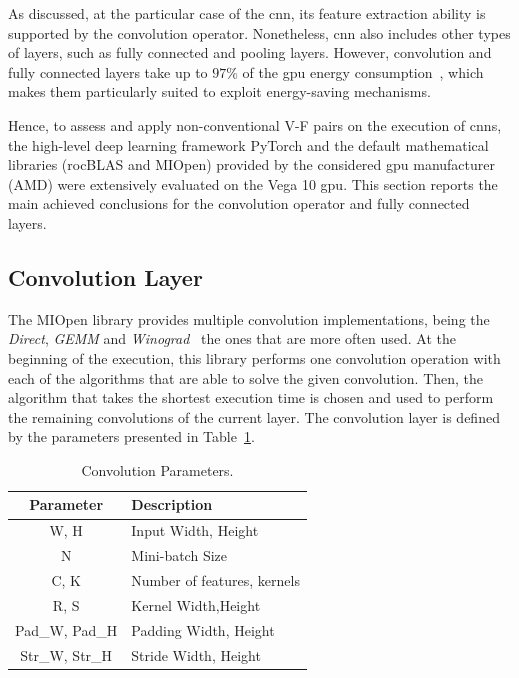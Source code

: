 As discussed, at the particular case of the \acrshort{cnn}, its feature extraction ability is supported by the convolution operator. Nonetheless, \acrshort{cnn} also includes other types of layers, such as fully connected and pooling layers. However, convolution and fully connected layers take up to $97\%$ of the \acrshort{gpu} energy consumption~\cite{li_evaluating_2016}, which makes them particularly suited to exploit energy-saving mechanisms. 

Hence, to assess and apply non-conventional V-F pairs on the execution of \acrshort{cnn}s, the high-level deep learning framework PyTorch and the default mathematical libraries (rocBLAS and MIOpen) provided by the considered \acrshort{gpu} manufacturer (AMD) were extensively evaluated on the Vega 10 \acrshort{gpu}. This section reports the main achieved conclusions for the convolution operator and fully connected layers.

\subsection{Convolution Layer}

The MIOpen library provides multiple convolution implementations, being the \textit{Direct}, \textit{GEMM} and \textit{Winograd}~\cite{khan_miopen_2019} the ones that are more often used. 
At the beginning of the execution, this library performs one convolution operation with each of the algorithms that are able to solve the given convolution. Then, the algorithm that takes the shortest execution time is chosen and used to perform the remaining convolutions of the current layer. The convolution layer is defined by the parameters presented in Table~\ref{tab:convparams}. 

\begin{table}[htbp]
\begin{center}
\begin{tabular}{cl}
\hline
\textbf{Parameter}&\textbf{Description} \\ 
\hline
W, H & Input Width, Height\\
N & Mini-batch Size \\
C, K & Number of features, kernels \\
R, S & Kernel Width,Height\\
Pad\_W, Pad\_H & Padding Width, Height \\
Str\_W, Str\_H & Stride Width, Height \\
\hline
\end{tabular}
\label{tab:convparams}
\end{center}

\caption{Convolution Parameters.}
\end{table}

